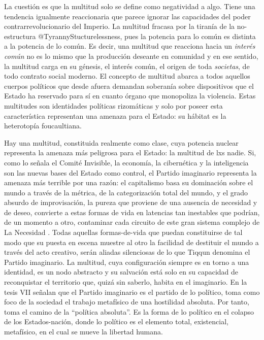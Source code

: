 La cuestión es que la multitud solo se define como negatividad a algo. Tiene una tendencia igualmente reaccionaria que parece ignorar las capacidades del poder contrarrevolucionario del Imperio. La multitud fracasa por la tiranía de la no-estructura @TyrannyStucturelessness, pues la potencia para lo común es distinta a la potencia de lo común. Es decir, una multitud que reacciona hacia un \emph{interés común} no es lo mismo que la producción deseante en comunidad y en ese sentido, la multitud carga en su génesis, el interés común, el origen de toda \emph{societas}, de todo contrato social moderno. El concepto de multitud abarca a todos aquellos cuerpos políticos que desde afuera demandan soberanía sobre dispositivos que el Estado ha reservado para sí en cuanto órgano que monopoliza la violencia. Estas multitudes son identidades políticas rizomáticas y solo por poseer esta característica representan una amenaza para el Estado: su hábitat es la heterotopía foucaultiana.

Hay una multitud, constituida realmente como clase, cuya potencia nuclear representa la amenaza más peligrosa para el Estado: la multitud de lxs nadie. Si, como lo señala el Comité Invisible, la economía, la cibernética y la inteligencia son las nuevas bases del Estado como control, el Partido imaginario representa la amenaza más terrible por una razón: el capitalismo basa su dominación sobre el mundo a través de la métrica, de la categorización total del mundo, y el grado absurdo de improvisación, la pureza que proviene de una ausencia de necesidad y de deseo, convierte a estas formas de vida en latencias tan inestables que podrían, de un momento a otro, contaminar cada circuito de este gran sistema complejo de La Necesidad \autocite{EconomiaConsideradaComo}. Todas aquellas formas-de-vida que puedan constituirse de tal modo que su puesta en escena muestre al otro la facilidad de destituir el mundo a través del acto creativo, serán aliadas silenciosas de lo que Tiqqun denomina el Partido imaginario. La multitud, cuya configuración siempre es en torno a una identidad, es un nodo abstracto y su salvación está solo en su capacidad de reconquistar el territorio que, quizá sin saberlo, habita en el imaginario. En la tesis VII señalan que el Partido imaginario es el partido de lo político, toma como foco de la sociedad el trabajo metafísico de una hostilidad absoluta. Por tanto, toma el camino de la \enquote{política absoluta}. Es la forma de lo político en el colapso de los Estados-nación, donde lo político es el elemento total, existencial, metafísico, en el cual se mueve la libertad humana.

